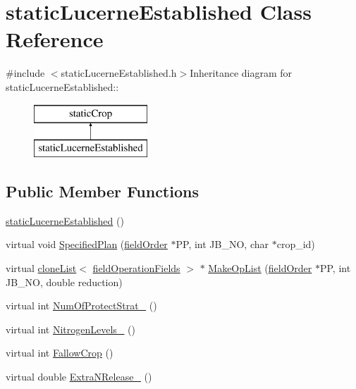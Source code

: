 \hypertarget{classstatic_lucerne_established}{
\section{staticLucerneEstablished Class Reference}
\label{classstatic_lucerne_established}
}


{\ttfamily \#include $<$staticLucerneEstablished.h$>$}Inheritance diagram for staticLucerneEstablished::\begin{figure}[H]
\begin{center}
\leavevmode
\includegraphics[height=2cm]{classstatic_lucerne_established}
\end{center}
\end{figure}
\subsection*{Public Member Functions}
\begin{DoxyCompactItemize}
\item 
\hyperlink{classstatic_lucerne_established_a60fcea211f812a48031c68eb419b27c0}{staticLucerneEstablished} ()
\item 
virtual void \hyperlink{classstatic_lucerne_established_adf4e2439ff973bd63859965a8fb64d77}{SpecifiedPlan} (\hyperlink{classfield_order}{fieldOrder} $\ast$PP, int JB\_\-NO, char $\ast$crop\_\-id)
\item 
virtual \hyperlink{classclone_list}{cloneList}$<$ \hyperlink{classfield_operation_fields}{fieldOperationFields} $>$ $\ast$ \hyperlink{classstatic_lucerne_established_a155fbfb890d5167c27a18f05517ab6fb}{MakeOpList} (\hyperlink{classfield_order}{fieldOrder} $\ast$PP, int JB\_\-NO, double reduction)
\item 
virtual int \hyperlink{classstatic_lucerne_established_a312ee9177d791b69210a96d09b738a14}{NumOfProtectStrat\_\-} ()
\item 
virtual int \hyperlink{classstatic_lucerne_established_ac7b10e73130036adeb73de6d771ec814}{NitrogenLevels\_\-} ()
\item 
virtual int \hyperlink{classstatic_lucerne_established_a011b54874a78edb25be05c3ab4d4d641}{FallowCrop} ()
\item 
virtual double \hyperlink{classstatic_lucerne_established_adfaea4391ee1981284ea351c5dbd0b6d}{ExtraNRelease\_\-} ()
\end{DoxyCompactItemize}


